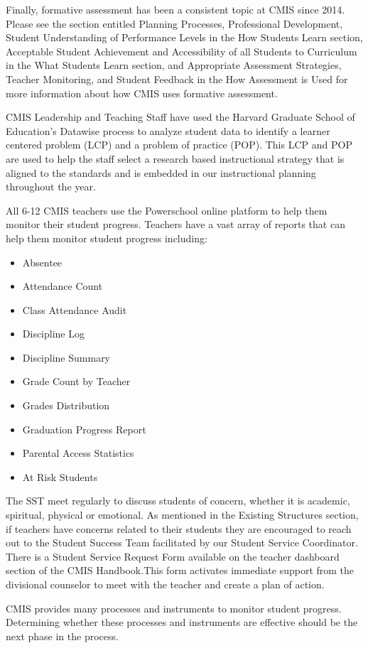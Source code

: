 \begin{findings}
Finally, formative assessment has been a consistent topic at CMIS since 2014. Please see the section entitled Planning Processes, Professional Development, Student Understanding of Performance Levels in the How Students Learn section, Acceptable Student Achievement and Accessibility of all Students to Curriculum in the What Students Learn section, and Appropriate Assessment Strategies, Teacher Monitoring, and Student Feedback in the How Assessment is Used for more information about how CMIS uses formative assessment. 


CMIS Leadership and Teaching Staff have used the Harvard Graduate School of Education’s Datawise process to analyze student data to identify a learner centered problem (LCP) and a problem of practice (POP). This LCP and POP are used to help the staff select a research based instructional strategy that is aligned to the standards and is embedded in our instructional planning  throughout the year. 

 
All 6-12 CMIS teachers use the Powerschool online platform to help them monitor their student progress. Teachers have a vast array of reports that can help them monitor student progress including: 

\begin{itemize}
\item Absentee	
\item Attendance Count	
\item Class Attendance Audit
\item Discipline Log	
\item Discipline Summary
\item Grade Count by Teacher	
\item Grades Distribution	
\item Graduation Progress Report 
\item Parental Access Statistics
\item At Risk Students	
\end{itemize}


The SST meet regularly to discuss students of concern, whether it is academic, spiritual, physical or emotional. As mentioned in the Existing Structures section, if teachers have concerns related to their students they are encouraged to reach out to the Student Success Team facilitated by our Student Service Coordinator. There is a Student Service Request Form available on the teacher dashboard section of the CMIS Handbook.This form activates immediate support from the divisional counselor to meet with the teacher and create a plan of action.


CMIS provides many processes and instruments to monitor student progress. Determining whether these processes and instruments are effective should be the next phase in the process. 
\end{findings}

